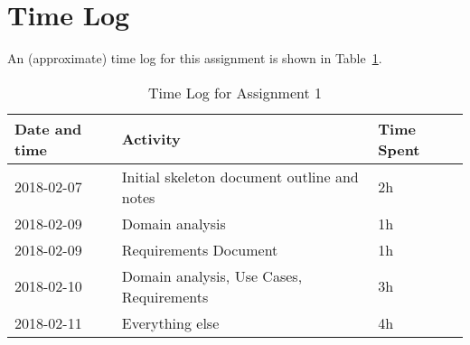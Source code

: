 %
%
%


\section{Time Log}
% 


An (approximate) time log for this assignment is shown in
Table~\ref{table-timelog}.

\begin{table}[]
  \centering
  \begin{tabular}{@{}l|l|l}
    \toprule
    Date and time & Activity                                     & Time Spent   \\
    \midrule
    2018-02-07    & Initial skeleton document outline and notes  & 2h           \\
    2018-02-09    & Domain analysis                              & 1h           \\
    2018-02-09    & Requirements Document                        & 1h           \\
    2018-02-10    & Domain analysis, Use Cases, Requirements     & 3h           \\
    2018-02-11    & Everything else                              & 4h           \\
    \bottomrule
  \end{tabular}
  \caption{Time Log for Assignment 1}
  \label{table-timelog}
\end{table}
